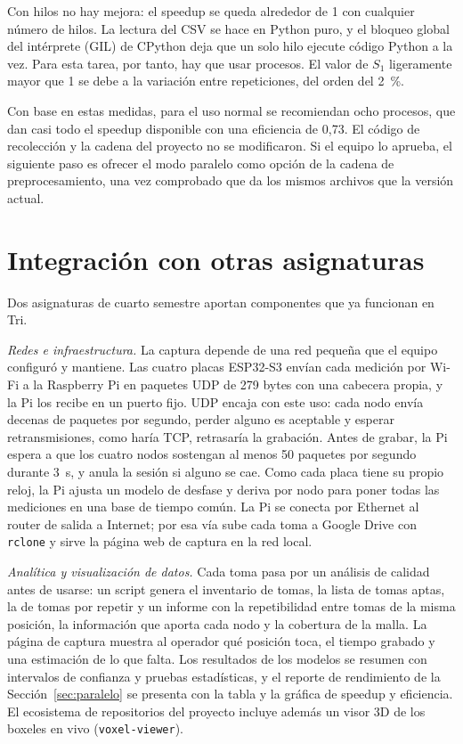 \documentclass[10pt,journal]{IEEEtran}
\begin{document}
Con hilos no hay mejora: el speedup se queda alrededor de 1 con cualquier número de hilos. La lectura del CSV se hace en Python puro, y el bloqueo global del intérprete (GIL) de CPython deja que un solo hilo ejecute código Python a la vez. Para esta tarea, por tanto, hay que usar procesos. El valor de $S_1$ ligeramente mayor que 1 se debe a la variación entre repeticiones, del orden del 2~\%.

Con base en estas medidas, para el uso normal se recomiendan ocho procesos, que dan casi todo el speedup disponible con una eficiencia de 0,73. El código de recolección y la cadena del proyecto no se modificaron. Si el equipo lo aprueba, el siguiente paso es ofrecer el modo paralelo como opción de la cadena de preprocesamiento, una vez comprobado que da los mismos archivos que la versión actual.

\section{Integración con otras asignaturas}\label{sec:integracion}
Dos asignaturas de cuarto semestre aportan componentes que ya funcionan en Tri.

\emph{Redes e infraestructura.} La captura depende de una red pequeña que el equipo configuró y mantiene. Las cuatro placas ESP32-S3 envían cada medición por Wi-Fi a la Raspberry Pi en paquetes UDP de 279 bytes con una cabecera propia, y la Pi los recibe en un puerto fijo. UDP encaja con este uso: cada nodo envía decenas de paquetes por segundo, perder alguno es aceptable y esperar retransmisiones, como haría TCP, retrasaría la grabación. Antes de grabar, la Pi espera a que los cuatro nodos sostengan al menos 50 paquetes por segundo durante 3~s, y anula la sesión si alguno se cae. Como cada placa tiene su propio reloj, la Pi ajusta un modelo de desfase y deriva por nodo para poner todas las mediciones en una base de tiempo común. La Pi se conecta por Ethernet al router de salida a Internet; por esa vía sube cada toma a Google Drive con \texttt{rclone} y sirve la página web de captura en la red local.

\emph{Analítica y visualización de datos.} Cada toma pasa por un análisis de calidad antes de usarse: un script genera el inventario de tomas, la lista de tomas aptas, la de tomas por repetir y un informe con la repetibilidad entre tomas de la misma posición, la información que aporta cada nodo y la cobertura de la malla. La página de captura muestra al operador qué posición toca, el tiempo grabado y una estimación de lo que falta. Los resultados de los modelos se resumen con intervalos de confianza y pruebas estadísticas, y el reporte de rendimiento de la Sección~\ref{sec:paralelo} se presenta con la tabla y la gráfica de speedup y eficiencia. El ecosistema de repositorios del proyecto incluye además un visor 3D de los boxeles en vivo (\texttt{voxel-viewer}).
\end{document}
